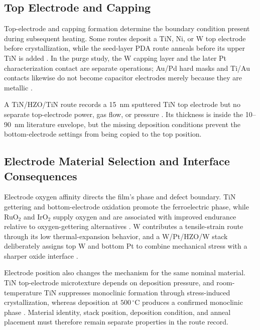 \documentclass[11pt,a4paper]{report}
\begin{document}
\subsection{Top Electrode and Capping}
\label{sec:ald-top-electrode}

Top-electrode and capping formation determine the boundary condition present during subsequent heating. Some routes deposit a TiN, Ni, or W top electrode before crystallization, while the seed-layer PDA route anneals before its upper TiN is added \cite{choi2022chamber,song2023seed,zhang2015inductive,kashir2021wake}. In the purge study, the W capping layer and the later Pt characterization contact are separate operations; Au/Pd hard masks and Ti/Au contacts likewise do not become capacitor electrodes merely because they are metallic \cite{choi2025purge,kim2020tin,kaatranen2026unif}.

A TiN/HZO/TiN route records a 15~nm sputtered TiN top electrode but no separate top-electrode power, gas flow, or pressure \cite{tsai2022stress}. Its thickness is inside the 10--90~nm literature envelope, but the missing deposition conditions prevent the bottom-electrode settings from being copied to the top position.

\subsection{Electrode Material Selection and Interface Consequences}
\label{sec:ald-electrode-material-selection}

Electrode oxygen affinity directs the film's phase and defect boundary. TiN gettering and bottom-electrode oxidation promote the ferroelectric phase, while RuO$_2$ and IrO$_2$ supply oxygen and are associated with improved endurance relative to oxygen-gettering alternatives \cite{silva2023road,kim2020tin}. W contributes a tensile-strain route through its low thermal-expansion behavior, and a W/Pt/HZO/W stack deliberately assigns top W and bottom Pt to combine mechanical stress with a sharper oxide interface \cite{silva2023road,kashir2021wake}.

Electrode position also changes the mechanism for the same nominal material. TiN top-electrode microtexture depends on deposition pressure, and room-temperature TiN suppresses monoclinic formation through stress-induced crystallization, whereas deposition at $500\,^{\circ}$C produces a confirmed monoclinic phase \cite{silva2023road,kim2020tin}. Material identity, stack position, deposition condition, and anneal placement must therefore remain separate properties in the route record.
\end{document}

